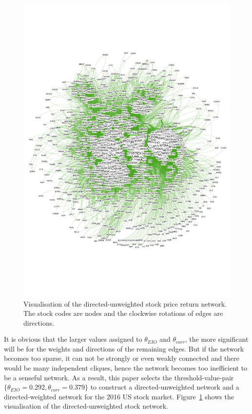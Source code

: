 \begin{figure}
	\begin{center}
		\includegraphics[width=14cm]{Graph_01}
	\end{center}
	\caption{Visualisation of the directed-unweighted stock price return network. The stock codes are nodes and the clockwise rotations of edges are directions.}
	\label{fig:Graph_01}
\end{figure}

It is obvious that the larger values assigned to $\theta_{EIO}$ and $\theta_{corr}$, the more significant will be for the weights and directions of the remaining edges. But if the network becomes too sparse, it can not be strongly or even weakly connected and there would be many independent cliques, hence the network becomes too inefficient to be a senseful network. As a result, this paper selects the threshold-value-pair $\{\theta_{EIO}=0.292, \theta_{corr}=0.379\}$ to construct a directed-unweighted network and a directed-weighted network for the 2016 US stock market. Figure~\ref{fig:Graph_01} shows the visualisation of the directed-unweighted stock network.

